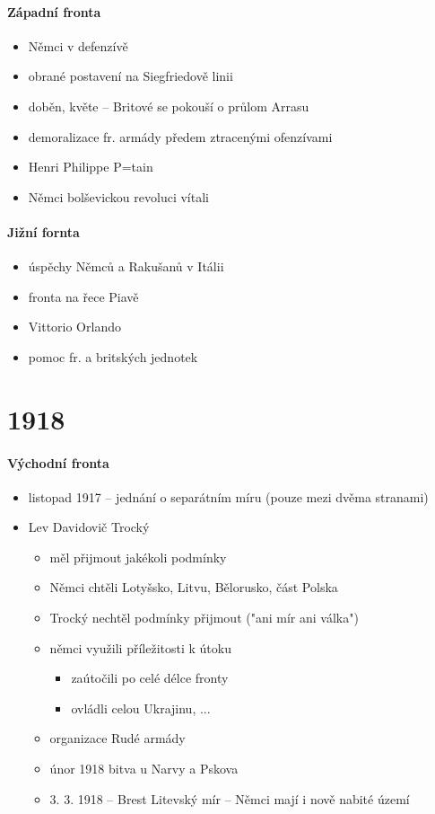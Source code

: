 \paragraph{Západní fronta}
\begin{itemize}
\item Němci v defenzívě
\item obrané postavení na Siegfriedově linii
\item doběn, květe -- Britové se pokouší o průlom Arrasu
\item demoralizace fr. armády předem ztracenými ofenzívami
\item Henri Philippe P=tain
\item Němci bolševickou revoluci vítali
\end{itemize}


\paragraph{Jižní fornta}
\begin{itemize}
\item úspěchy Němců a Rakušanů v Itálii
\item fronta na řece Piavě
\item Vittorio Orlando
\item pomoc fr. a britských jednotek
\end{itemize}


\section{1918}
\paragraph{Východní fronta}
\begin{itemize}
\item listopad 1917 -- jednání o separátním míru (pouze mezi dvěma stranami)
\item Lev Davidovič Trocký
	\begin{itemize}
	\item měl přijmout jakékoli podmínky
	\item Němci chtěli Lotyšsko, Litvu, Bělorusko, část Polska
	\item Trocký nechtěl podmínky přijmout ("ani mír ani válka")
	\item němci využili příležitosti k útoku
		\begin{itemize}
		\item zaútočili po celé délce fronty
		\item ovládli celou Ukrajinu, ...
		\end{itemize}
	\item[\ra] organizace Rudé armády
	\item únor 1918 bitva u Narvy a Pskova
	\item 3. 3. 1918 -- Brest Litevský mír -- Němci mají i nově nabité území
	\end{itemize}
\end{itemize}

